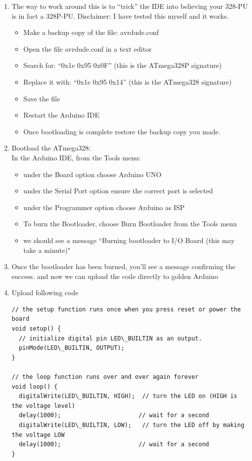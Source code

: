\documentclass[a4paper,11pt]{article}%
\begin{document}
\begin{enumerate}
	\item The way to work around this is to “trick” the IDE into believing your 328-PU is in fact a 328P-PU. Disclaimer: I have tested this myself and it works.\\
	      \begin{itemize}
		      \item Make a backup copy of the file: avrdude.conf
		      \item Open the file avrdude.conf in a text editor
		      \item Search for: “0x1e 0x95 0x0F” (this is the ATmega328P signature)
		      \item Replace it with: “0x1e 0x95 0x14” (this is the ATmega328 signature)
		      \item Save the file
		      \item Restart the Arduino IDE
		      \item Once bootloading is complete restore the backup copy you made.
	      \end{itemize}
	\item Bootload the ATmega328:\\
	      In the Arduino IDE, from the Tools menu:
	      \begin{itemize}
		      \item under the Board option choose Arduino UNO
		      \item under the Serial Port option ensure the correct port is selected
		      \item under the Programmer option choose Arduino as ISP
		      \item To burn the Bootloader, choose Burn Bootloader from the Tools menu
		      \item we should see a message “Burning bootloader to I/O Board (this may take a minute)"
	      \end{itemize}

	\item Once the bootloader has been burned, you’ll see a message confirming the success. and now we can upload the code directly to golden Arduino
	\item Upload following code
	      \begin{lstlisting}
// the setup function runs once when you press reset or power the board
void setup() {
  // initialize digital pin LED\_BUILTIN as an output.
  pinMode(LED\_BUILTIN, OUTPUT);
}

// the loop function runs over and over again forever
void loop() {
  digitalWrite(LED\_BUILTIN, HIGH);  // turn the LED on (HIGH is the voltage level)
  delay(1000);                      // wait for a second
  digitalWrite(LED\_BUILTIN, LOW);   // turn the LED off by making the voltage LOW
  delay(1000);                      // wait for a second
}
\end{lstlisting}


\end{enumerate}
\end{document}
